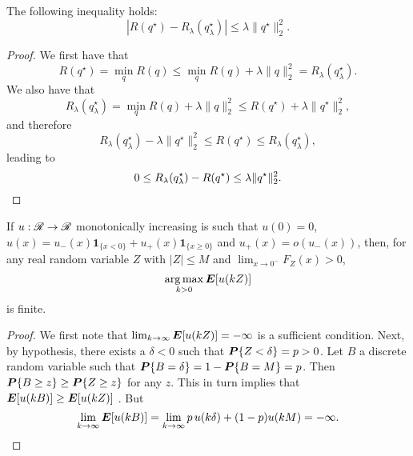 \begin{claim}
  \label{delage_bound_claim}
  The following inequality holds:
  \[
    |R(q^\star) - R_\lambda(q^\star_\lambda)| \leq \lambda\|q^\star\|^2_2.
  \]
\end{claim}
\begin{proof}
  We first have that
  \[
    R(q^\star) = \min_q R(q) \leq \min_q R(q) + \lambda\|q\|_2^2 = R_\lambda(q^\star_\lambda).
  \]
  We also have that
  \[
    R_\lambda(q^\star_\lambda) = \min_q R(q) + \lambda\|q\|^2_2 \leq R(q^\star) + \lambda\|q^\star\|^2_2,
  \]
  and therefore
  \[
    R_\lambda(q^\star_\lambda) - \lambda\|q^\star\|^2_2 \leq R(q^\star) \leq R_\lambda(q^\star_\lambda),
  \]
  leading to
  \[
    0 \leq R_\lambda(q^\star_\lambda) - R(q^\star) \leq \lambda\|q^\star\|^2_2.\qedhere
  \]
\end{proof}

\begin{claim}
  \label{claim_finite}
  If $u:\mathscr{R}\to\mathscr{R}$ monotonically increasing is such that $u(0) = 0$,
  $u(x) = u_-(x)\bm1_{\{x<0\}}+u_+(x)\bm 1_{\{x\geq 0\}}$ and $u_+(x) = o(u_-(x))$, then,
  for any real random variable $Z$ with $|Z|\leq M$ and $\lim_{x\to0^-}F_Z(x)>0$,
  \[
    \operatorname*{arg\,max}_{k>0} \bm E[u(kZ)]
  \]
  is finite.
\end{claim}
\begin{proof}
  We first note that $\lim_{k\to\infty} \bm E[u(kZ)]=-\infty$ is a sufficient condition. Next,
  by hypothesis, there exists a $\delta<0$ such that $\bm P\{Z<\delta\}=p>0$. Let $B$ a
  discrete random variable such that $\bm P\{B=\delta\}=1-\bm P\{B=M\}=p$. Then $\bm P\{B\geq
  z\}\geq\bm P\{Z\geq z\}$ for any $z$. This in turn implies that
  $\bm E[u(kB)]\geq\bm E[u(kZ)]$ . But 
  \[
    \lim_{k\to\infty}\bm E[u(kB)] = \lim_{k\to\infty}p\,u(k\delta)+(1-p)u(kM) = -\infty.\qedhere
  \]
\end{proof}

